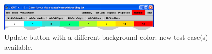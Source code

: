 \begin{figure}[!ht]
\begin{center}
\includegraphics[width=0.70\textwidth]{fig/update-button.eps}
\caption{\label{fig:update-button} Update button with a different
background color: new test case(s) available.}
\end{center}
\end{figure}
